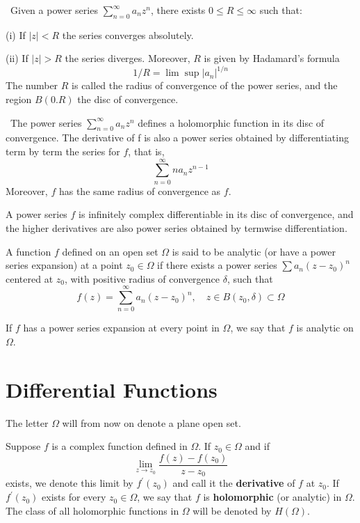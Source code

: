 \documentclass[12pt, oneside]{book}
\begin{document}
\begin{theorem}\
    Given a power series $\sum\limits_{n=0}^{\infty }a_nz^n$, there exists $0\leq R\leq \infty$ such that:

    (i) If $\left|z\right|<R$ the series converges absolutely.

    (ii) If $\left|z\right|>R$ the series diverges. Moreover, $R$ is given by Hadamard's formula
    $$1/R=\lim\sup|a_n|^{1/n}$$
    The number $R$ is called the radius of convergence of the power series, and the region $B(0.R)$ the disc of convergence.
\end{theorem}
\begin{theorem}\
    The power series $\sum\limits_{n=0}^{\infty }a_nz^n$ defines a holomorphic function in its disc of convergence. The derivative of f is also a
    power series obtained by differentiating term by term the series for $f$, that is,
    $$\sum\limits_{n=0}^{\infty }na_nz^{n-1}$$
    Moreover, $f$ has the same radius of convergence as $f$.
\end{theorem}
\begin{corollary}
    A power series $f$ is infinitely complex differentiable in its disc of convergence, and the higher derivatives are also power series obtained by termwise differentiation.
\end{corollary}
\begin{definition}
    A function $f$ defined on an open set $\Omega$ is said to be analytic (or have a power series expansion) at a point $z_0\in\Omega$ if there exists a power series $\sum a_n(z-z_0)^n$ centered at $z_0$, with positive radius of convergence $\delta$, such that
    $$f(z)=\sum_{n=0}^{\infty}a_n (z-z_0)^n,\quad z\in B(z_0,\delta)\subset\Omega$$

    If $f$ has a power series expansion at every point in $\Omega$, we say that $f$ is analytic on $\Omega$.
\end{definition}


\section{Differential Functions}

The letter $\Omega$ will from now on denote a plane open set.
\begin{definition}
    Suppose $f$ is a complex function defined in $\Omega$. If $z_0 \in \Omega$ and if
    \begin{equation*}
        \lim_{z \rightarrow z_0} \frac{f(z)-f\left(z_0\right)}{z-z_0}
    \end{equation*}
    exists, we denote this limit by $f^{\prime}\left(z_0\right)$ and call it the \textbf{derivative} of $f$ at $z_0$. If $f^{\prime}\left(z_0\right)$ exists for every $z_0 \in \Omega$, we say that $f$ is \textbf{holomorphic} (or analytic) in $\Omega$. The class of all holomorphic functions in $\Omega$ will be denoted by $H(\Omega)$.
\end{definition}
\end{document}

